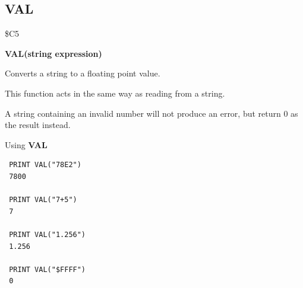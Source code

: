 
\newpage
\subsection{VAL}
\begin{description}[leftmargin=2cm,style=nextline]
\item [Token:] \$C5
\item [Format:] {\bf VAL(string expression)}
\item [Usage:] Converts a string to a floating point value.

               This function acts in the same way as reading from a string.

\item [Remarks:] A string containing an invalid number
                 will not produce an error, but return 0 as the result instead.

\item [Example:] Using {\bf VAL}
\begin{tcolorbox}[colback=black,coltext=white]
\verbatimfont{\codefont}
\begin{verbatim}
 PRINT VAL("78E2")
 7800

 PRINT VAL("7+5")
 7

 PRINT VAL("1.256")
 1.256

 PRINT VAL("$FFFF")
 0
\end{verbatim}
\end{tcolorbox}
\end{description}


\newpage
